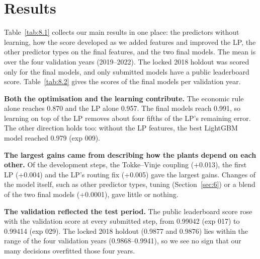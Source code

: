 \section{Results}\label{sec:8}

Table~\ref{tab:8.1} collects our main results in one place: the predictors without learning, how the score developed as we added features and improved the LP, the other predictor types on the final features, and the two final models. The mean is over the four validation years (2019--2022). The locked 2018 holdout was scored only for the final models, and only submitted models have a public leaderboard score. Table~\ref{tab:8.2} gives the scores of the final models per validation year.

\begin{table}[H]
  \centering\small
  \caption{All results: mean validation AUC over folds A--D, the locked 2018 holdout and the public leaderboard}
  \label{tab:8.1}
\end{table}

\begin{table}[H]
  \centering\small
  \caption{The final models per validation fold}
  \label{tab:8.2}
\end{table}

\textbf{Both the optimisation and the learning contribute.} The economic rule alone reaches 0.870 and the LP alone 0.957. The final models reach 0.991, so learning on top of the LP removes about four fifths of the LP's remaining error. The other direction holds too: without the LP features, the best LightGBM model reached 0.979 (exp 009).

\textbf{The largest gains came from describing how the plants depend on each other.} Of the development steps, the Tokke--Vinje coupling (+0.013), the first LP (+0.004) and the LP's routing fix (+0.005) gave the largest gains. Changes of the model itself, such as other predictor types, tuning (Section~\ref{sec:6}) or a blend of the two final models (+0.0001), gave little or nothing.

\textbf{The validation reflected the test period.} The public leaderboard score rose with the validation score at every submitted step, from 0.99042 (exp 017) to 0.99414 (exp 029). The locked 2018 holdout (0.9877 and 0.9876) lies within the range of the four validation years (0.9868--0.9941), so we see no sign that our many decisions overfitted those four years.

